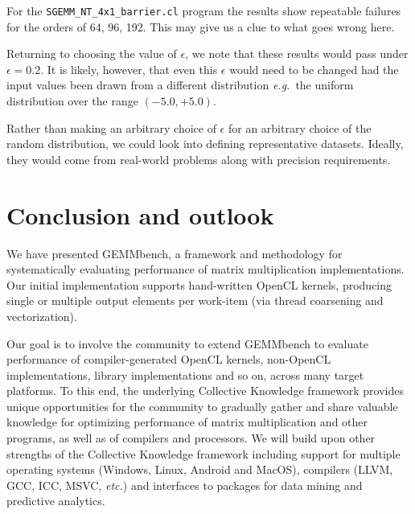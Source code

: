 \documentclass{acm_proc_article-sp} %
\begin{document}
For the \verb|SGEMM_NT_4x1_barrier.cl| program the results show repeatable
failures for the orders of 64, 96, 192.
%
This may give us a clue to what goes wrong here.

Returning to choosing the value of $\epsilon$, we note that these results would pass
under $\epsilon = 0.2$.
%
It is likely, however, that even this $\epsilon$ would need to be changed had
the input values been drawn from a different distribution {\em e.g.}\ the
uniform distribution over the range $(-5.0, +5.0)$.

Rather than making an arbitrary choice of $\epsilon$ for an arbitrary choice of
the random distribution, we could look into defining representative datasets.
%
Ideally, they would come from real-world problems along with precision
requirements.
%

%



\section{Conclusion and outlook}

We have presented GEMMbench, a framework and methodology for systematically
evaluating performance of matrix multiplication implementations.
%
Our initial implementation supports hand-written OpenCL kernels, producing
single or multiple output elements per work-item (via thread coarsening and
vectorization).
%

Our goal is to involve the community to extend GEMMbench to evaluate
performance of compiler-generated OpenCL kernels, non-OpenCL implementations,
library implementations and so on, across many target platforms.
%
To this end, the underlying Collective Knowledge framework provides unique
opportunities for the community to gradually gather and share valuable
knowledge for optimizing performance of matrix multiplication and other
programs, as well as of compilers and processors.
%
We will build upon other strengths of the Collective Knowledge framework including
support for multiple operating systems (Windows, Linux, Android and MacOS),
compilers (LLVM, GCC, ICC, MSVC, {\em etc.}) and interfaces to packages for
data mining and predictive analytics.
\end{document}

